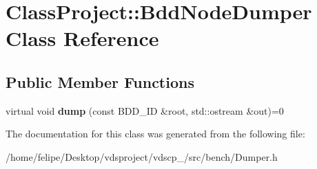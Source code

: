\section{Class\+Project\+:\+:Bdd\+Node\+Dumper Class Reference}
\label{classClassProject_1_1BddNodeDumper}
\subsection*{Public Member Functions}
\begin{DoxyCompactItemize}
\item 
virtual void {\bfseries dump} (const B\+D\+D\+\_\+\+ID \&root, std\+::ostream \&out)=0\label{classClassProject_1_1BddNodeDumper_a611562f9f308c185375a6270b603e572}

\end{DoxyCompactItemize}


The documentation for this class was generated from the following file\+:\begin{DoxyCompactItemize}
\item 
/home/felipe/\+Desktop/vdsproject/vdscp\+\_/src/bench/Dumper.\+h\end{DoxyCompactItemize}
